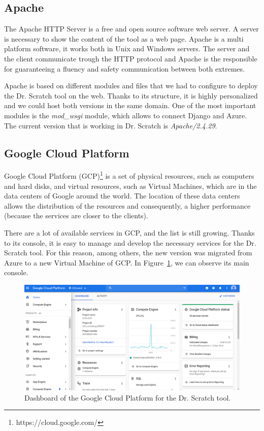 \subsection{Apache}
\label{subsec:apache}

The Apache HTTP Server is a free and open source software web server. A server is necessary to show the content of the tool as a web page. Apache is a multi platform software, it works both in Unix and Windows servers. The server and the client communicate trough the HTTP protocol and Apache is the responsible for guaranteeing a fluency and safety communication between both extremes.

Apache is based on different modules and files that we had to configure to deploy the Dr. Scratch tool on the web. Thanks to its structure, it is highly personalized and we could host both versions in the same domain. One of the most important modules is the \textit{mod\_wsgi} module, which allows to connect Django and Azure. The current version that is working in Dr. Scratch is \textit{Apache/2.4.29}.  


\subsection{Google Cloud Platform}
\label{subsec:google}

Google Cloud Platform (GCP)\footnote{https://cloud.google.com/} is a set of physical resources, such as computers and hard disks, and virtual resources, such as Virtual Machines, which are in the data centers of Google around the world. The location of these data centers allows the distribution of the resources and consequently, a higher performance (because the services are closer to the clients).

There are a lot of available services in GCP, and the list is still growing. Thanks to its console, it is easy to manage and develop the necessary services for the Dr. Scratch tool. For this reason, among others, the new version was migrated from Azure to a new Virtual Machine of GCP. In Figure~\ref{fig:GCP}, we can observe its main console.

\begin{figure}
    \centering
        \includegraphics[width=13cm, keepaspectratio]{img/GCP.png}
        \caption{Dashboard of the Google Cloud Platform for the Dr. Scratch tool.}
        \label{fig:GCP}
\end{figure}



